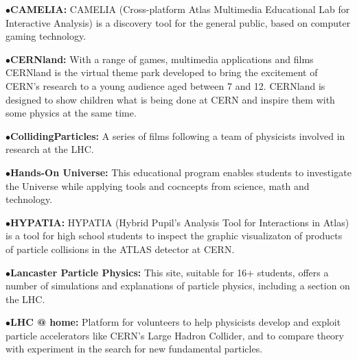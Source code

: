 \medskip

\item{$\bullet$}{\bf CAMELIA:} 
CAMELIA (Cross-platform Atlas Multimedia Educational Lab for Interactive Analysis) is a discovery tool for the general public, based on computer gaming technology.
	\item{}

\medskip

\item{$\bullet$}{\bf CERNland:}
With a range of games, multimedia applications and films CERNland is the virtual theme park developed to bring the excitement of CERN's research to a young audience aged between 7 and 12. CERNland is designed to show children what is being done at CERN and inspire them with some physics at the same time.
	\item{}

\medskip

\item{$\bullet$}{\bf CollidingParticles:}
A series of films following a team of physicists involved in research at the LHC.
	\item{}
\medskip

\item{$\bullet$}{\bf Hands-On Universe:}
This educational program enables students to investigate the Universe while applying tools and cocncepts from science, math and technology.
	\item{}
\medskip

\item{$\bullet$}{\bf HYPATIA:}
HYPATIA (Hybrid Pupil's Analysis Tool for Interactions in Atlas) is a tool for high school students to inspect the graphic visualizaton of products of particle collisions in the ATLAS detector at CERN.
	\item{}
\medskip

\item{$\bullet$}{\bf Lancaster Particle Physics:}
This site, suitable for 16+ students,  offers a number of simulations and explanations of particle physics, including a section on the LHC. 
	\item{}

\medskip

\item{$\bullet$}{\bf LHC @ home:}
Platform for volunteers to help physicists develop and exploit particle accelerators like CERN's Large Hadron Collider, and to compare theory with experiment in the search for new fundamental particles.
	\item{}

